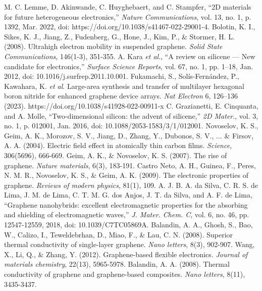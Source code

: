 \documentclass[conference]{IEEEtran}
\begin{document}
\begin{thebibliography}{00}
   M. C. Lemme, D. Akinwande, C. Huyghebaert, and C. Stampfer, ``2D materials for future heterogeneous electronics,'' \textit{Nature Communications}, vol. 13, no. 1, p. 1392, Mar. 2022, doi: https://doi.org/10.1038/s41467-022-29001-4.
   Bolotin, K. I., Sikes, K. J., Jiang, Z., Fudenberg, G., Hone, J., Kim, P., \& Stormer, H. L. (2008). Ultrahigh electron mobility in suspended graphene. \textit{Solid State Communications}, 146(1-3), 351-355.
   A. Kara \textit{et al}., ``A review on silicene — New candidate for electronics,'' \textit{Surface Science Reports}, vol. 67, no. 1, pp. 1–18, Jan. 2012, doi: 10.1016/j.surfrep.2011.10.001.
   Fukamachi, S., Sol\'is-Fern\'andez, P., Kawahara, K. \textit{et al}. Large-area synthesis and transfer of multilayer hexagonal boron nitride for enhanced graphene device arrays. \textit{Nat Electron} 6, 126–136 (2023). https://doi.org/10.1038/s41928-022-00911-x
   C. Grazianetti, E. Cinquanta, and A. Molle, ``Two-dimensional silicon: the advent of silicene,'' \textit{2D Mater}., vol. 3, no. 1, p. 012001, Jan. 2016, doi: 10.1088/2053-1583/3/1/012001.
   Novoselov, K. S., Geim, A. K., Morozov, S. V., Jiang, D., Zhang, Y., Dubonos, S. V., ... \& Firsov, A. A. (2004). Electric field effect in atomically thin carbon films. \textit{Science}, 306(5696), 666-669.
   Geim, A. K., \& Novoselov, K. S. (2007). The rise of graphene. \textit{Nature materials}, 6(3), 183-191.
   Castro Neto, A. H., Guinea, F., Peres, N. M. R., Novoselov, K. S., \& Geim, A. K. (2009). The electronic properties of graphene. \textit{Reviews of modern physics}, 81(1), 109.
   A. J. B. A. da Silva, C. R. S. de Lima, J. M. de Lima, C. T. M. G. dos Anjos, J. T. da Silva, and A. F. de Lima, ``Graphene nanohybrids: excellent electromagnetic properties for the absorbing and shielding of electromagnetic waves,'' \textit{J. Mater. Chem. C}, vol. 6, no. 46, pp. 12547-12559, 2018, doi: 10.1039/C7TC05869A.
   Balandin, A. A., Ghosh, S., Bao, W., Calizo, I., Teweldebrhan, D., Miao, F., \& Lau, C. N. (2008). Superior thermal conductivity of single-layer graphene. \textit{Nano letters}, 8(3), 902-907.
   Wang, X., Li, Q., \& Zhang, Y. (2012). Graphene-based flexible electronics. \textit{Journal of materials chemistry}, 22(13), 5965-5978.
   Balandin, A. A. (2008). Thermal conductivity of graphene and graphene-based composites. \textit{Nano letters}, 8(11), 3435-3437.

\end{thebibliography}
\end{document}
